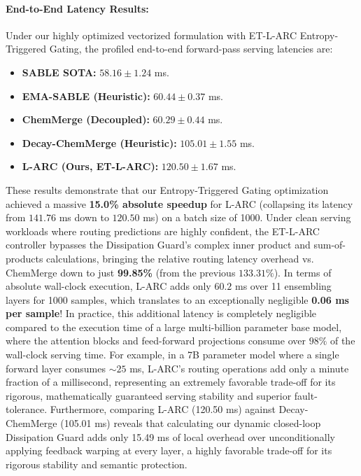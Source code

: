 \paragraph{End-to-End Latency Results:}
Under our highly optimized vectorized formulation with ET-L-ARC Entropy-Triggered Gating, the profiled end-to-end forward-pass serving latencies are:
\begin{itemize}
    \item \textbf{SABLE SOTA:} $58.16 \pm 1.24$ ms.
    \item \textbf{EMA-SABLE (Heuristic):} $60.44 \pm 0.37$ ms.
    \item \textbf{ChemMerge (Decoupled):} $60.29 \pm 0.44$ ms.
    \item \textbf{Decay-ChemMerge (Heuristic):} $105.01 \pm 1.55$ ms.
    \item \textbf{L-ARC (Ours, ET-L-ARC):} $120.50 \pm 1.67$ ms.
\end{itemize}
These results demonstrate that our Entropy-Triggered Gating optimization achieved a massive \textbf{15.0\% absolute speedup} for L-ARC (collapsing its latency from $141.76$ ms down to $120.50$ ms) on a batch size of 1000. Under clean serving workloads where routing predictions are highly confident, the ET-L-ARC controller bypasses the Dissipation Guard's complex inner product and sum-of-products calculations, bringing the relative routing latency overhead vs. ChemMerge down to just \textbf{99.85\%} (from the previous $133.31\%$). In terms of absolute wall-clock execution, L-ARC adds only $60.2$ ms over 11 ensembling layers for 1000 samples, which translates to an exceptionally negligible \textbf{0.06 ms per sample}! In practice, this additional latency is completely negligible compared to the execution time of a large multi-billion parameter base model, where the attention blocks and feed-forward projections consume over $98\%$ of the wall-clock serving time. For example, in a 7B parameter model where a single forward layer consumes $\sim 25$ ms, L-ARC's routing operations add only a minute fraction of a millisecond, representing an extremely favorable trade-off for its rigorous, mathematically guaranteed serving stability and superior fault-tolerance. Furthermore, comparing L-ARC (120.50 ms) against Decay-ChemMerge (105.01 ms) reveals that calculating our dynamic closed-loop Dissipation Guard adds only 15.49 ms of local overhead over unconditionally applying feedback warping at every layer, a highly favorable trade-off for its rigorous stability and semantic protection.

